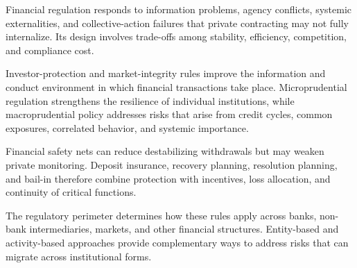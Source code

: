 

Financial regulation responds to information problems, agency conflicts, systemic externalities, and collective-action failures that private contracting may not fully internalize. Its design involves trade-offs among stability, efficiency, competition, and compliance cost.

Investor-protection and market-integrity rules improve the information and conduct environment in which financial transactions take place. Microprudential regulation strengthens the resilience of individual institutions, while macroprudential policy addresses risks that arise from credit cycles, common exposures, correlated behavior, and systemic importance.

Financial safety nets can reduce destabilizing withdrawals but may weaken private monitoring. Deposit insurance, recovery planning, resolution planning, and bail-in therefore combine protection with incentives, loss allocation, and continuity of critical functions.

The regulatory perimeter determines how these rules apply across banks, non-bank intermediaries, markets, and other financial structures. Entity-based and activity-based approaches provide complementary ways to address risks that can migrate across institutional forms.





